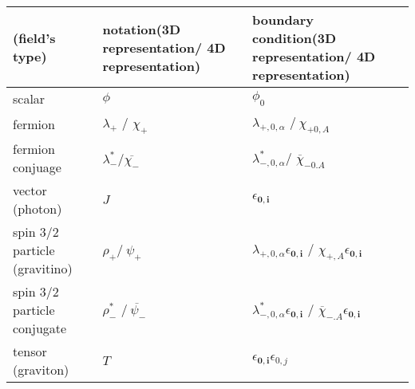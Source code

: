 \documentclass[11pt,a4paper]{article}
\begin{document}
\begin{tabularx}{\textwidth}{|K|K|K|}
\hline 
 \textbf{(field's type)} & \textbf{notation}(3D representation/ 4D representation) & \textbf{boundary condition}(3D representation/ 4D representation) \\
\hline\hline 
 scalar & $\displaystyle \phi $ & $\displaystyle \phi _{0}$ \\
\hline 
 fermion  & $ $$\displaystyle \lambda _{+}$ / $\displaystyle \chi _{+}$ & $\displaystyle \lambda _{+,0,\alpha }$ /$\displaystyle \ \chi _{+0,A}$ \\
\hline 
 fermion conjuage & $\displaystyle \lambda _{-}^{*}$/$\displaystyle \overline{\chi _{-}}$ & $\displaystyle \lambda _{-,0,\alpha }^{*}$$ $/ $\displaystyle \overline{\chi }_{-0.A}$ \\
\hline 
 vector (photon) & $\displaystyle J$ & $\displaystyle \epsilon \mathbf{_{0,i}}$ \\
\hline 
 spin 3/2 particle (gravitino) & $\displaystyle \rho _{+}$/$\displaystyle \ \psi _{+}$ & $\displaystyle \lambda _{+,0,\alpha }$$\displaystyle \epsilon \mathbf{_{0,i}}$ / $\displaystyle \chi _{+,A} \epsilon \mathbf{_{0,i}}$ \\
\hline 
 {\small spin 3/2 particle conjugate} & $\displaystyle \rho _{-}^{*}$ /$\displaystyle \overline{\ \psi _{-}}$ & $\displaystyle \lambda _{-,0,\alpha }^{*}$$\displaystyle \epsilon \mathbf{_{0,i}}$ / $\displaystyle \overline{\chi }_{-.A} \epsilon \mathbf{_{0,i}}$ \\
\hline 
 tensor (graviton) & $\displaystyle T$ & $\displaystyle \epsilon \mathbf{_{0,i}}$$\displaystyle \epsilon _{0,j}$ \\
 \hline
\end{tabularx}
\end{document}
